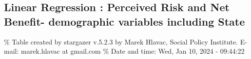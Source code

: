 \documentclass[
]{article}
\begin{document}
\begin{landscape}
\newpage

\hypertarget{linear-regression-perceived-risk-and-net-benefit--demographic-variables-including-state}{%
\subsection{Linear Regression : Perceived Risk and Net Benefit-
demographic variables including
State}\label{linear-regression-perceived-risk-and-net-benefit--demographic-variables-including-state}}

\begingroup\small\setlength{\tabcolsep}{1pt}

\renewcommand{\arraystretch}{0.7}

\% Table created by stargazer v.5.2.3 by Marek Hlavac, Social Policy
Institute. E-mail: marek.hlavac at gmail.com \% Date and time: Wed, Jan
10, 2024 - 09:44:22


\end{landscape}
\end{document}
